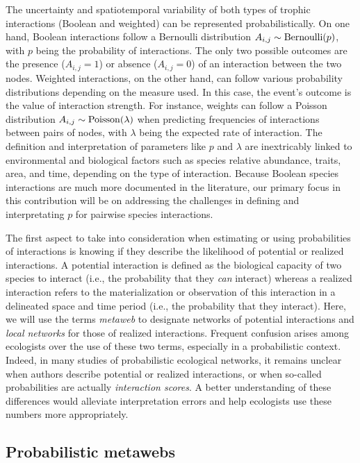 \documentclass[10pt,oneside]{article}
\begin{document}
The uncertainty and spatiotemporal variability of both types of trophic
interactions (Boolean and weighted) can be represented
probabilistically. On one hand, Boolean interactions follow a Bernoulli
distribution \(A_{i,j} \sim {\rm Bernoulli}(p)\), with \(p\) being the
probability of interactions. The only two possible outcomes are the
presence (\(A_{i,j} = 1\)) or absence (\(A_{i,j} = 0\)) of an
interaction between the two nodes. Weighted interactions, on the other
hand, can follow various probability distributions depending on the
measure used. In this case, the event's outcome is the value of
interaction strength. For instance, weights can follow a Poisson
distribution \(A_{i,j} \sim {\rm Poisson}(\lambda)\) when predicting
frequencies of interactions between pairs of nodes, with \(\lambda\)
being the expected rate of interaction. The definition and
interpretation of parameters like \(p\) and \(\lambda\) are inextricably
linked to environmental and biological factors such as species relative
abundance, traits, area, and time, depending on the type of interaction.
Because Boolean species interactions are much more documented in the
literature, our primary focus in this contribution will be on addressing
the challenges in defining and interpretating \(p\) for pairwise species
interactions.

The first aspect to take into consideration when estimating or using
probabilities of interactions is knowing if they describe the likelihood
of potential or realized interactions. A potential interaction is
defined as the biological capacity of two species to interact (i.e., the
probability that they \emph{can} interact) whereas a realized
interaction refers to the materialization or observation of this
interaction in a delineated space and time period (i.e., the probability
that they interact). Here, we will use the terms \emph{metaweb} to
designate networks of potential interactions and \emph{local networks}
for those of realized interactions. Frequent confusion arises among
ecologists over the use of these two terms, especially in a
probabilistic context. Indeed, in many studies of probabilistic
ecological networks, it remains unclear when authors describe potential
or realized interactions, or when so-called probabilities are actually
\emph{interaction scores}. A better understanding of these differences
would alleviate interpretation errors and help ecologists use these
numbers more appropriately.

\hypertarget{probabilistic-metawebs}{%
\subsection{Probabilistic metawebs}\label{probabilistic-metawebs}}
\end{document}
